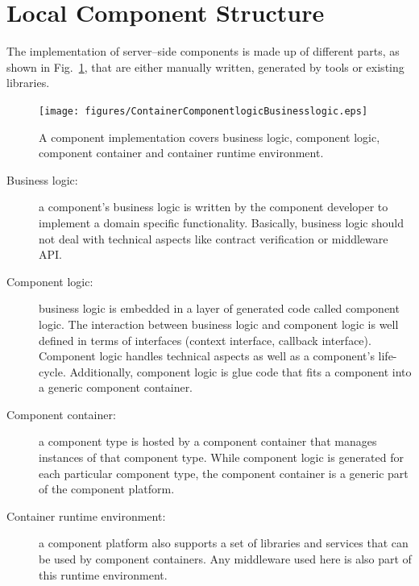 \section{Local Component Structure}
\label{ComponentStructure}

The implementation of server--side components is made up of different parts,
as shown in Fig.~\ref{ContainerComponentlogicBusinesslogic}, that are either
manually written, generated by tools or existing libraries.

\begin{figure}[htbp]
    \begin{center}
    \texttt{[image: figures/ContainerComponentlogicBusinesslogic.eps]}
    \caption{A component implementation covers business logic, component
    logic, component container and container runtime environment.}
    \label{ContainerComponentlogicBusinesslogic}            
    \end{center}
\end{figure}

\begin{description}
\item [Business logic:]
  a component's business logic is written by the component developer to 
  implement   a domain specific functionality.
  Basically, business logic should not deal with technical aspects like contract
  verification or middleware API.
  
\item [Component logic:]
  business logic is embedded in a layer of generated code called component 
  logic. The interaction between business logic and component logic is well 
  defined in terms of interfaces (context interface, callback interface).
  Component logic handles technical aspects as well as a component's life-cycle.
  Additionally, component logic is glue code that fits a component into a 
  generic component container.
  
\item [Component container:]
  a component type is hosted by a component container that manages instances of
  that component type.
  While component logic is generated for each particular component type, the 
  component container is a generic part of the component platform.
  
\item [Container runtime environment:]
  a component platform also supports a set of libraries and services that can 
  be used by component containers.
  Any middleware used here is also part of this runtime environment.
\end{description}


